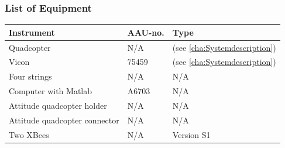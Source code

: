 \subsubsection{List of Equipment}
\begin{table}[H]
	\begin{tabular}{|l|l|p{4.3cm}|}
		\hline%
		\textbf{Instrument}   &  \textbf{AAU-no.}  &  \textbf{Type}                       \\
		\hline%
		Quadcopter    	&  N/A 						&  (see \autoref{cha:Systemdescription}) 		      	 \\
		\hline%
	    Vicon 			& 75459                 &  (see \autoref{cha:Systemdescription})                  \\
		\hline%
		Four strings            &  N/A               & N/A     \\
		\hline%
		Computer with Matlab       &  A6703		 & N/A     \\
		\hline%
		Attitude quadcopter holder      &  N/A		 & N/A     \\
		\hline%
		Attitude quadcopter connector    &  N/A		 & N/A     \\
		\hline%
		Two XBees      &  N/A		 & Version S1    \\
		\hline%

	\end{tabular}
\end{table}

